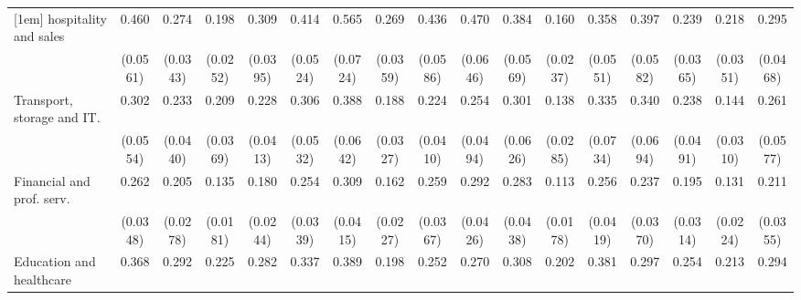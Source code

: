 {\begin{tabular}{l*{16}{c}}
[1em]
hospitality and sales&       0.460\sym{***}&       0.274\sym{***}&       0.198\sym{***}&       0.309\sym{***}&       0.414\sym{***}&       0.565\sym{***}&       0.269\sym{***}&       0.436\sym{***}&       0.470\sym{***}&       0.384\sym{***}&       0.160\sym{***}&       0.358\sym{***}&       0.397\sym{***}&       0.239\sym{***}&       0.218\sym{***}&       0.295\sym{***}\\
                    &    (0.0561)         &    (0.0343)         &    (0.0252)         &    (0.0395)         &    (0.0524)         &    (0.0724)         &    (0.0359)         &    (0.0586)         &    (0.0646)         &    (0.0569)         &    (0.0237)         &    (0.0551)         &    (0.0582)         &    (0.0365)         &    (0.0351)         &    (0.0468)         \\
[1em]
Transport, storage and IT.&       0.302\sym{***}&       0.233\sym{***}&       0.209\sym{***}&       0.228\sym{***}&       0.306\sym{***}&       0.388\sym{***}&       0.188\sym{***}&       0.224\sym{***}&       0.254\sym{***}&       0.301\sym{***}&       0.138\sym{***}&       0.335\sym{***}&       0.340\sym{***}&       0.238\sym{***}&       0.144\sym{***}&       0.261\sym{***}\\
                    &    (0.0554)         &    (0.0440)         &    (0.0369)         &    (0.0413)         &    (0.0532)         &    (0.0642)         &    (0.0327)         &    (0.0410)         &    (0.0494)         &    (0.0626)         &    (0.0285)         &    (0.0734)         &    (0.0694)         &    (0.0491)         &    (0.0310)         &    (0.0577)         \\
[1em]
Financial and prof. serv.&       0.262\sym{***}&       0.205\sym{***}&       0.135\sym{***}&       0.180\sym{***}&       0.254\sym{***}&       0.309\sym{***}&       0.162\sym{***}&       0.259\sym{***}&       0.292\sym{***}&       0.283\sym{***}&       0.113\sym{***}&       0.256\sym{***}&       0.237\sym{***}&       0.195\sym{***}&       0.131\sym{***}&       0.211\sym{***}\\
                    &    (0.0348)         &    (0.0278)         &    (0.0181)         &    (0.0244)         &    (0.0339)         &    (0.0415)         &    (0.0227)         &    (0.0367)         &    (0.0426)         &    (0.0438)         &    (0.0178)         &    (0.0419)         &    (0.0370)         &    (0.0314)         &    (0.0224)         &    (0.0355)         \\
[1em]
Education and healthcare&       0.368\sym{***}&       0.292\sym{***}&       0.225\sym{***}&       0.282\sym{***}&       0.337\sym{***}&       0.389\sym{***}&       0.198\sym{***}&       0.252\sym{***}&       0.270\sym{***}&       0.308\sym{***}&       0.202\sym{***}&       0.381\sym{***}&       0.297\sym{***}&       0.254\sym{***}&       0.213\sym{***}&       0.294\sym{***}\\

\end{tabular}}
